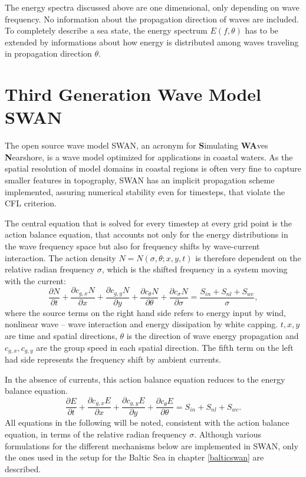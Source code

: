 The energy spectra discussed above are one dimensional, only depending on wave 
frequency. No information about the propagation direction of waves are 
included. To completely describe a sea state, the energy spectrum $E(f,\theta)$ 
has to be extended by informations about how energy is distributed among waves 
traveling in propagation direction $\theta$.

\section{Third Generation Wave Model SWAN}

The open source wave model SWAN, an acronym for \textbf{S}imulating 
\textbf{WA}ves \textbf{N}earshore, is a wave model optimized for applications in 
coastal waters. As the spatial resolution of model domains in coastal regions is 
often very fine to capture smaller features in topography, SWAN has an implicit 
propagation scheme implemented, assuring numerical stability even for timesteps, 
that violate the CFL criterion. 

The central equation that is solved for every timestep at every grid point is 
the action balance equation, that accounts not only for the energy 
distributions 
in the wave frequency space but also for frequency shifts by wave-current 
interaction. The action density $N=N(\sigma,\theta; x,y,t)$ is therefore 
dependent on the relative radian frequency $\sigma$, which is the shifted 
frequency in a system moving with the current: 
\begin{equation}\label{ebe}
 \frac{\partial N}{\partial t} + \frac{\partial c_{g,x} N}{\partial x} + \frac{ 
\partial c_{g,y} N}{\partial y} + \frac{\partial c_{\theta} N}{\partial \theta} 
+ 
\frac{\partial c_{\sigma} N}{\partial \sigma}= \frac{S_{in} + S_{nl} + 
S_{wc}}{\sigma},
\end{equation}
where the source terms on the right hand side refers to energy input by wind, 
nonlinear wave -- wave interaction and energy dissipation by white capping. $t, 
x ,y$ are time and spatial directions, $\theta$ is the direction of wave energy 
propagation and $c_{g,x}, c_{g,y}$ are the group speed in each spatial 
direction. The fifth term on the left had side represents the frequency shift 
by 
ambient currents.

In the absence of currents, this action balance equation reduces to the energy 
balance equation.
\begin{equation}\label{ebe}
 \frac{\partial E}{\partial t} + \frac{\partial c_{g,x} E}{\partial x} + \frac{ 
\partial c_{g,y} E}{\partial y} + \frac{\partial c_{\theta} E}{\partial \theta} 
= 
S_{in} + S_{nl} + S_{wc}.
\end{equation}
All equations in the following will be noted, consistent with the action balance 
equation, in terms of the relative radian frequency $\sigma$. Although various 
formulations for the different mechanisms below are implemented in SWAN, only 
the ones used in the setup for the Baltic Sea in chapter \ref{balticswan} are 
described.

